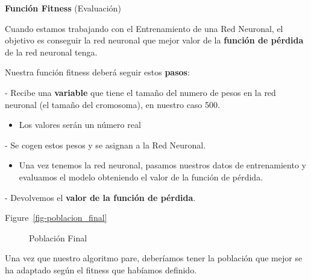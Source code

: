 \documentclass[
  a4paper,
  DIV=11,
  numbers=noendperiod]{scrreprt}
\providecommand{\tightlist}{%
  \setlength{\itemsep}{0pt}\setlength{\parskip}{0pt}}\usepackage{longtable,booktabs,array}
\begin{document}
\textbf{Función Fitness} (Evaluación)

Cuando estamos trabajando con el Entrenamiento de una Red Neuronal, el
objetivo es conseguir la red neuronal que mejor valor de la
\textbf{función de pérdida} de la red neuronal tenga.

Nuestra función fitness deberá seguir estos \textbf{pasos}:

- Recibe una \textbf{variable} que tiene el tamaño del numero de pesos
en la red neuronal (el tamaño del cromosoma), en nuestro caso 500.

\begin{itemize}
\tightlist
\item
  Los valores serán un número real
\end{itemize}

- Se cogen estos pesos y se asignan a la Red Neuronal.

\begin{itemize}
\tightlist
\item
  Una vez tenemos la red neuronal, pasamos nuestros datos de
  entrenamiento y evaluamos el modelo obteniendo el valor de la función
  de pérdida.
\end{itemize}

- Devolvemos el \textbf{valor de la función de pérdida}.

Figure~\ref{fig-poblacion_final}

\begin{figure}


\caption{\label{fig-poblacion_final_entrenamiento_red}Población Final}

\end{figure}%

Una vez que nuestro algoritmo pare, deberíamos tener la población que
mejor se ha adaptado según el fitness que habíamos definido.
\end{document}
